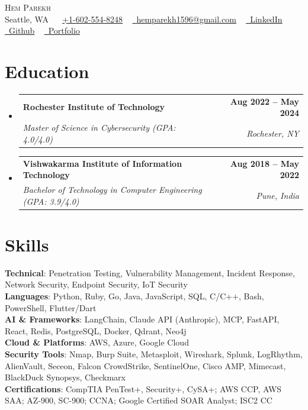 \documentclass[letterpaper,11pt]{article}
\makeatletter
\newcommand{\resumeSubheading}[4]{
  \vspace{-2pt}\item
    \begin{tabular*}{1.0\textwidth}[t]{l@{\extracolsep{\fill}}r}
      \textbf{#1} & \textbf{\small #2} \\
      \textit{\small#3} & \textit{\small #4} \\
    \end{tabular*}\vspace{-7pt}
}
\newcommand{\resumeSubHeadingListStart}{\begin{itemize}[leftmargin=0.0in, label={}]}
\newcommand{\resumeSubHeadingListEnd}{\end{itemize}}
\makeatother
\begin{document}
\begin{center}
    {\Huge \scshape Hem Parekh} \\ \vspace{1pt}
    \small
    Seattle, WA ~
    \raisebox{-0.1\height}\faPhone\ \underline{+1-602-554-8248} ~
    \href{mailto:hemparekh1596@gmail.com}{\raisebox{-0.2\height}\faEnvelope\ \underline{hemparekh1596@gmail.com}} ~
    \href{https://www.linkedin.com/in/hem-parekh/}{\raisebox{-0.2\height}\faLinkedin\ \underline{LinkedIn}} ~
    \href{https://github.com/Hem1700}{\raisebox{-0.2\height}\faGithub\ \underline{Github}} ~
    \href{https://hem1700.github.io/}{\raisebox{-0.2\height}\faGlobe\ \underline{Portfolio}}
    \vspace{-8pt}
\end{center}

\section{Education}
  \resumeSubHeadingListStart
    \resumeSubheading
      {Rochester Institute of Technology}{Aug 2022 -- May 2024}
      {Master of Science in Cybersecurity (GPA: 4.0/4.0)}{Rochester, NY}
    \resumeSubheading
      {Vishwakarma Institute of Information Technology}{Aug 2018 -- May 2022}
      {Bachelor of Technology in Computer Engineering (GPA: 3.9/4.0)}{Pune, India}
  \resumeSubHeadingListEnd

\section{Skills}
 \begin{itemize}[leftmargin=0.15in, label={}]
    \small{\item{
     \textbf{Technical}{: Penetration Testing, Vulnerability Management, Incident Response, Network Security, Endpoint Security, IoT Security} \\
     \textbf{Languages}{: Python, Ruby, Go, Java, JavaScript, SQL, C/C++, Bash, PowerShell, Flutter/Dart} \\
     \textbf{AI \& Frameworks}{: LangChain, Claude API (Anthropic), MCP, FastAPI, React, Redis, PostgreSQL, Docker, Qdrant, Neo4j} \\
     \textbf{Cloud \& Platforms}{: AWS, Azure, Google Cloud} \\
     \textbf{Security Tools}{: Nmap, Burp Suite, Metasploit, Wireshark, Splunk, LogRhythm, AlienVault, Seceon, Falcon CrowdStrike, SentinelOne, Cisco AMP, Mimecast, BlackDuck Synopsys, Checkmarx} \\
     \textbf{Certifications}{: CompTIA PenTest+, Security+, CySA+; AWS CCP, AWS SAA; AZ-900, SC-900; CCNA; Google Certified SOAR Analyst; ISC2 CC} \\
    }}
 \end{itemize}
 \vspace{-16pt}
\end{document}
